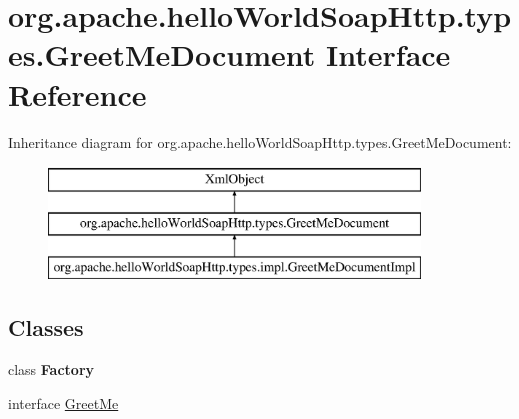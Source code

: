 \hypertarget{interfaceorg_1_1apache_1_1hello_world_soap_http_1_1types_1_1_greet_me_document}{}\section{org.\+apache.\+hello\+World\+Soap\+Http.\+types.\+Greet\+Me\+Document Interface Reference}
\label{interfaceorg_1_1apache_1_1hello_world_soap_http_1_1types_1_1_greet_me_document}
Inheritance diagram for org.\+apache.\+hello\+World\+Soap\+Http.\+types.\+Greet\+Me\+Document\+:\begin{figure}[H]
\begin{center}
\leavevmode
\includegraphics[height=3.000000cm]{interfaceorg_1_1apache_1_1hello_world_soap_http_1_1types_1_1_greet_me_document}
\end{center}
\end{figure}
\subsection*{Classes}
\begin{DoxyCompactItemize}
\item 
class {\bfseries Factory}
\item 
interface \hyperlink{interfaceorg_1_1apache_1_1hello_world_soap_http_1_1types_1_1_greet_me_document_1_1_greet_me}{Greet\+Me}
\end{DoxyCompactItemize}
